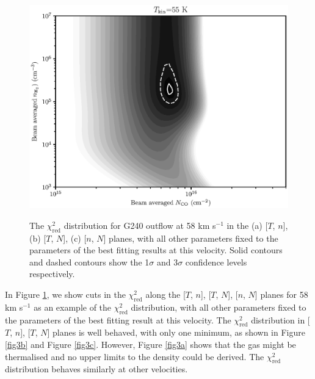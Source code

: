 \begin{figure}[tbp]
{\begin{minipage}[b]{0.5\textwidth}
\includegraphics[width=1\textwidth]{./fig/chiimage_tkin_paper.eps}
\label{fig3c}
\end{minipage}
}
\caption{The $\chi_{\mathrm{red}}^2$ distribution for G240 outflow at 58 km s$^{-1}$ in the (a) [$T$, $n$], (b) [$T$, $N$], (c) [$n$, $N$] planes, with all other parameters fixed to the parameters of the best fitting results at this velocity. Solid contours and dashed contours show the 1$\sigma$ and 3$\sigma$ confidence levels respectively. \label{fig3}}
\end{figure}

In Figure \ref{fig3}, we show cuts in the $\chi_{\mathrm{red}}^2$ along the [$T$, $n$], [$T$, $N$], [$n$, $N$] planes for 58 km s$^{-1}$ as an example of the $\chi_{\mathrm{red}}^2$ distribution, with all other parameters fixed to  the parameters of the best fitting result at this velocity. The $\chi_{\mathrm{red}}^2$ distribution in [$T$, $n$], [$T$, $N$] planes is well behaved, with only one minimum, as shown in Figure \ref{fig3b} and Figure \ref{fig3c}. However, Figure \ref{fig3a} shows that the gas might be thermalised and no upper limits to the density could be derived. The $\chi_{\mathrm{red}}^2$ distribution behaves similarly at other velocities. 

